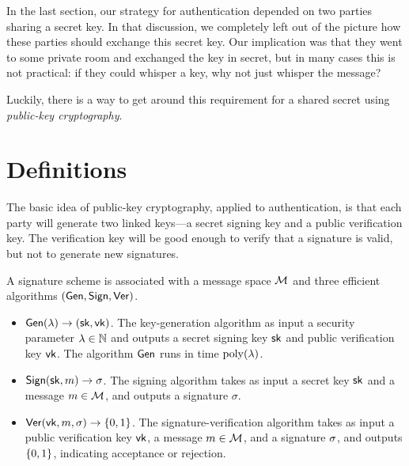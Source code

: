 In the last section, our strategy for
authentication depended on two parties sharing a
secret key.
In that discussion, we completely left
out of the picture how these parties should
exchange this secret key.
Our implication was that they
went to some private room and exchanged the key in
secret, but in many cases this is not practical:
if they could whisper a key, why not just whisper the message?

Luckily, there is a way to get around this requirement for a shared secret using \emph{public-key cryptography}.\cite{DH76} %

\section{Definitions}
The basic idea of public-key cryptography, applied
to authentication, is that each party will
generate two linked keys---a secret signing key
and a public verification key.
The verification key will be good enough to verify that a signature
is valid, but not to generate new signatures.

\begin{definition}
	A signature scheme is associated with a message space $\mathcal{M}$ and three efficient algorithms $(\mathsf{Gen}, \mathsf{Sign}, \mathsf{Ver})$.

	\begin{itemize}
    \item $\mathsf{Gen}(\lambda) \to ({\mathsf{sk}}, \mathsf{vk})$.
      The key-generation algorithm as input a security parameter $\lambda \in \mathbb{N}$ and outputs a secret signing key ${\mathsf{sk}}$ and public verification key $\mathsf{vk}$.
      The algorithm $\mathsf{Gen}$ runs in time $\operatorname{poly}(\lambda)$.
    \item $\mathsf{Sign}({\mathsf{sk}}, m) \to \sigma$.
      The signing algorithm takes as input a secret key ${\mathsf{sk}}$ and a message $m \in \mathcal{M}$, and outputs a signature $\sigma$.
    \item $\mathsf{Ver}(\mathsf{vk}, m, \sigma) \to \{0,1\}$.
      The signature-verification algorithm takes as input a public verification key $\mathsf{vk}$, a message $m \in \mathcal{M}$, and a signature $\sigma$, 
      and outputs $\{0,1\}$, indicating acceptance or rejection.
	\end{itemize}
	
\end{definition}

